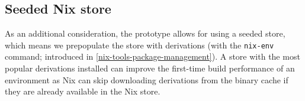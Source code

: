 \subsection{Seeded Nix store}\label{seeded-nix-store}
As an additional consideration, the prototype allows for using a seeded store, which means we prepopulate the store with derivations (with the \verb|nix-env| command; introduced in \ref{nix-tools-package-management}). A store with the most popular derivations installed can improve the first-time build performance of an environment as Nix can skip downloading derivations from the binary cache if they are already available in the Nix store. 


